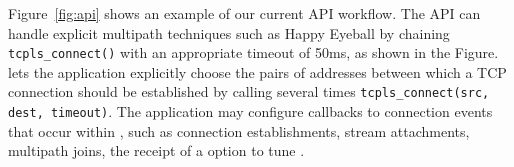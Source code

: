 Figure~\ref{fig:api} shows an example of our current API workflow. The API can
handle explicit multipath techniques such as Happy Eyeball by chaining
\texttt{tcpls\_connect()} with an appropriate timeout of 50ms, as shown in the
Figure. \tcpls lets the application explicitly choose the pairs of addresses
between which a TCP connection should be established by
calling several times \texttt{tcpls\_connect(src, dest, timeout)}. The
application may configure callbacks to connection events that occur within
\tcpls, such as connection establishments, stream attachments, multipath
joins, the receipt of a \tcp option to tune \tcp.







